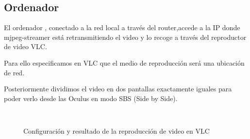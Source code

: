 \documentclass[twoside, 12pt]{epstfg}
\begin{document}
\newpage
\subsection{Ordenador}
El ordenador , conectado a la red local a través del router,accede a la IP donde mjpeg-streamer está retransmitiendo el video y lo recoge a través del reproductor de video VLC.

Para ello especificamos en VLC que el medio de reproducción será una ubicación de red.

Posteriormente dividimos el video en dos pantallas exactamente iguales para poder verlo desde las Oculus en modo SBS (Side by Side).

\begin{figure}[h]
	\centering
	\\
		\caption{Configuración y resultado de la reproducción de video en VLC} \label{figstream}
\end{figure}
\end{document}
